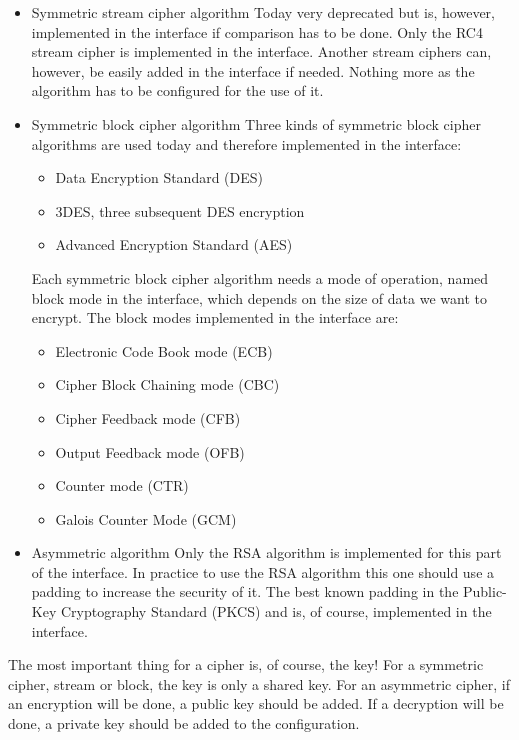 \begin{itemize}
  \item Symmetric stream cipher algorithm\newline
Today very deprecated but is, however, implemented in the interface if
comparison has to be done.
Only the RC4 stream cipher is implemented in the interface.
Another stream ciphers can, however, be easily added in the interface if
needed.
Nothing more as the algorithm has to be configured for the use of
it.
  \item Symmetric block cipher algorithm\newline
  Three kinds of symmetric block cipher algorithms are used today and
therefore implemented in the interface:
\begin{itemize}[noitemsep]
  \item Data Encryption Standard (DES)
  \item 3DES, three subsequent DES encryption
  \item Advanced Encryption Standard (AES)  
\end{itemize}
Each symmetric block cipher algorithm needs a mode of operation, named block
mode in the interface, which depends on the size of data we want to
encrypt.\newline
The block modes implemented in the interface are:
\begin{itemize}[noitemsep]
  \item Electronic Code Book mode (ECB)
  \item Cipher Block Chaining mode (CBC)
  \item Cipher Feedback mode (CFB)
  \item Output Feedback mode (OFB)
  \item Counter mode (CTR)
  \item Galois Counter Mode (GCM)
\end{itemize}
  \item Asymmetric algorithm\newline
  Only the RSA algorithm is implemented for this part of the interface.
  In practice to use the RSA algorithm this one should use a padding to increase
  the security of it.
  The best known padding in the Public-Key Cryptography Standard (PKCS) and is,
of course, implemented in the interface.\newline  
\end{itemize} 
The most important thing for a cipher is, of course, the key!
For a symmetric cipher, stream or block, the key is only a shared key.
For an asymmetric cipher, if an encryption will be done, a public key should
be added. If a decryption will be done, a private key should be added to the
configuration.

